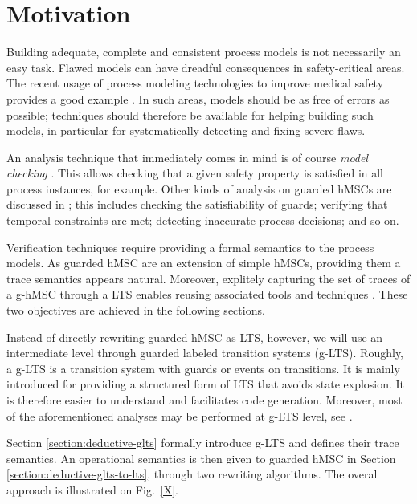 \section{Motivation\label{section:deductive-motivation}}

Building adequate, complete and consistent process models is not necessarily an easy task. Flawed models can have dreadful consequences in safety-critical areas. The recent usage of process modeling technologies to improve medical safety provides a good example \cite{Clarke:2008, Grando:2009, Damas:2011}. In such areas, models should be as free of errors as possible; techniques should therefore be available for helping building such models, in particular for systematically detecting and fixing severe flaws.

An analysis technique that immediately comes in mind is of course \emph{model checking} \cite{Clarke:1989}. This allows checking that a given safety property is satisfied in all process instances, for example. Other kinds of analysis on guarded hMSCs are discussed in \cite{Damas:2011}; this includes checking the satisfiability of guards; verifying that temporal constraints are met; detecting inaccurate process decisions; and so on.

Verification techniques require providing a formal semantics to the process models. As guarded hMSC are an extension of simple hMSCs, providing them a trace semantics appears natural. Moreover, explitely capturing the set of traces of a g-hMSC through a LTS enables reusing associated tools and techniques \cite{Magee:1999, Giannakopoulou:2003}. These two objectives are achieved in the following sections.

Instead of directly rewriting guarded hMSC as LTS, however, we will use an intermediate level through guarded labeled transition systems (g-LTS). Roughly, a g-LTS is a transition system with guards or events on transitions. It is mainly introduced for providing a structured form of LTS that avoids state explosion. It is therefore easier to understand and facilitates code generation. Moreover, most of the aforementioned analyses may be performed at g-LTS level, see \cite{Damas:2011}.

Section \ref{section:deductive-glts} formally introduce g-LTS and defines their trace semantics. An operational semantics is then given to guarded hMSC in Section \ref{section:deductive-glts-to-lts}, through two rewriting algorithms. The overal approach is illustrated on Fig.~\ref{X}.


